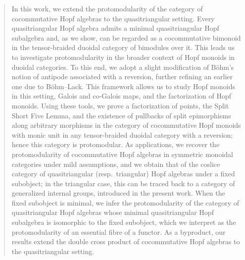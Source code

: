 \documentclass[nosumlimits,twoside]{amsart}
\theoremstyle{definition}
\theoremstyle{remark}
\newcommand{\Rr}{\mathcal{R}}
\begin{document}
\begin{abstract}
In this work, we extend the protomodularity of the category of cocommutative Hopf algebras to the quasitriangular setting. Every quasitriangular Hopf algebra admits a minimal quasitriangular Hopf subalgebra and, as we show, can be regarded as a cocommutative bimonoid in the tensor-braided duoidal category of bimodules over it. This leads us to investigate protomodularity in the broader context of Hopf monoids in duoidal categories. 
To this end, we adopt a slight modification of B\"{o}hm's notion of antipode  associated with a reversion, further refining an earlier one due to B\"{o}hm–Lack. This framework allows us to study Hopf monoids in this setting, Galois and co-Galois maps, and the factorization of Hopf monoids. Using these tools, we prove a factorization of points, the Split Short Five Lemma, and the existence of pullbacks of split epimorphisms along arbitrary morphisms in the category of cocommutative Hopf monoids  with monic unit in any tensor-braided duoidal category with a reversion; hence this category is protomodular.
As applications, we recover the protomodularity of cocommutative Hopf algebras in symmetric monoidal categories under mild assumptions, and we obtain that of the coslice category of quasitriangular (resp.\ triangular) Hopf algebras under a fixed subobject; in the triangular case, this can be traced back to a category of generalized internal groups, introduced in the present work. When the fixed subobject is minimal, we infer the protomodularity of the category of quasitriangular Hopf algebras whose minimal quasitriangular Hopf subalgebra is isomorphic to the fixed subobject, which we interpret as the protomodularity of an essential fibre of a functor. As a byproduct, our results extend the double cross product of cocommutative Hopf algebras to the quasitriangular
setting.
\end{abstract}

\maketitle
\end{document}
